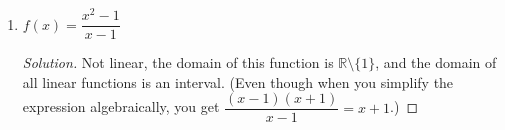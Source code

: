 \documentclass[12pt]{article}
\newenvironment{solution}{\begin{proof}[Solution]}{\end{proof}}
\begin{document}
\begin{enumerate}
\begin{enumerate}
\begin{solution}
				There is no $x$-intercept and the $y$-intercept is $(0,3)$. 
				
				Since the function is constant, it is not increasing nor decreasing, and both the minimum and maximum are $3$, achieved at every $x\in\mathbb{R}$.
				
				Since $f(x)=3>0$, the function is positive for all $x\in\mathbb{R}$.
				
			\end{solution}
			\item $f(x)=\dfrac{x^2-1}{x-1}$
		
			\begin{solution}
				Not linear, the domain of this function is $\mathbb{R} \setminus\{1\}$, and the domain of all linear functions is an interval. (Even though when you simplify the expression algebraically, you get $\dfrac{(x-1)(x+1)}{x-1}=x+1$.)
			\end{solution}
		\end{enumerate}
		

\end{enumerate}
\end{document}
